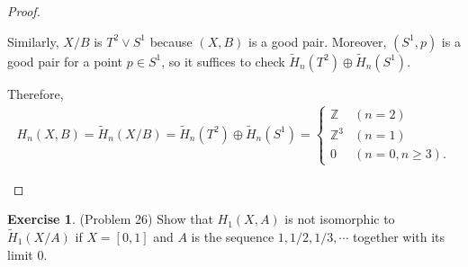 \documentclass[12pt, psamsfonts]{amsart}
\theoremstyle{definition}
\newtheorem*{exer}{Exercise}
\theoremstyle{remark}
\numberwithin{equation}{section}
\begin{document}
\begin{proof}
\begin{itemize}
      Similarly, $X / B$ is $T^2 \vee S^1$ because $(X, B)$ is a good pair.
      Moreover, $(S^1, p)$ is a good pair for a point $p \in S^1$, so it suffices to check $\tilde{H}_n(T^2) \oplus \tilde{H}_n(S^1)$.

      Therefore,
      \begin{align*}
        H_n(X, B) = \tilde{H}_n(X / B) = \tilde{H}_n(T^2) \oplus \tilde{H}_n(S^1) = \begin{cases}
          \mathbb{Z} & (n = 2) \\
          \mathbb{Z}^3 & (n = 1) \\
          0 & (n = 0, n \geq 3).
        \end{cases}
      \end{align*}
  \end{itemize}
\end{proof}

\begin{exer}{(Problem 26)}
  Show that $H_1(X, A)$ is not isomorphic to $\tilde{H}_1(X / A)$ if $X = [0, 1]$ and $A$ is the sequence $1, 1/2, 1/3, \cdots$ together with its limit 0.
\end{exer}
\end{document}
